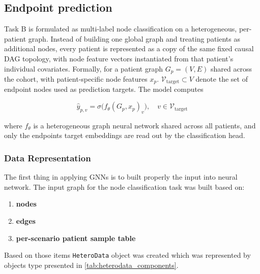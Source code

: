 \subsection{Endpoint prediction}

Task B is formulated as multi-label node classification on a heterogeneous, per-patient graph. 
Instead of building one global graph and treating patients as additional nodes, 
every patient is represented 
as a copy of the same fixed causal DAG topology, with node feature vectors instantiated from 
that patient's 
individual covariates. 
Formally, for a patient graph \(G_p = (V, E)\) shared across the cohort, with patient-specific node features
\(x_p\). \(\mathcal{V}_{\text{target}} \subset V\) denote the set of
endpoint nodes used as prediction targets. The model computes

\[
\hat{y}_{p,v} = \sigma\big(f_\theta(G_p, x_p)_v\big), \quad v \in \mathcal{V}_{\text{target}}
\]

where \(f_\theta\) is a heterogeneous graph neural network shared across all patients, 
and only the endpoints
target embeddings are read out by the classification head.

\subsubsection{Data Representation}
\label{subsec:taskb_data}

The first thing in applying GNNs is to built properly the input into neural network. The input graph for the node 
classification task was built based on: 

\begin{enumerate}[label=\alph*)]
    \item \textbf{nodes}
    \item \textbf{edges}
    \item \textbf{per-scenario patient sample table} 
\end{enumerate}

Based on those items \texttt{HeteroData} object was created which was represented by objects type 
presented in \cref{tab:heterodata_components}.

